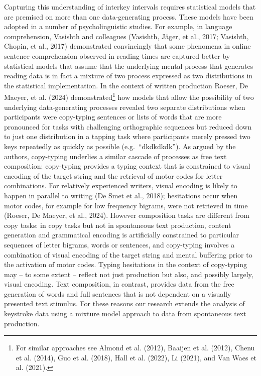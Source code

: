 \documentclass[
  man,floatsintext]{apa7}
\begin{document}
Capturing this understanding of interkey intervals requires statistical models that are premised on more than one data-generating process. These models have been adopted in a number of psycholinguistic studies. For example, in language comprehension, Vasishth and colleagues (Vasishth, Jäger, et al., 2017; Vasishth, Chopin, et al., 2017) demonstrated convincingly that some phenomena in online sentence comprehension observed in reading times are captured better by statistical models that assume that the underlying mental process that generates reading data is in fact a mixture of two process expressed as two distributions in the statistical implementation. In the context of written production Roeser, De Maeyer, et al. (2024) demonstrated\footnote{For similar approaches see Almond et al. (2012), Baaijen et al. (2012), Chenu et al. (2014), Guo et al. (2018), Hall et al. (2022), Li (2021), and Van Waes et al. (2021).} how models that allow the possibility of two underlying data-generating processes revealed two separate distributions when participants were copy-typing sentences or lists of words that are more pronounced for tasks with challenging orthographic sequences but reduced down to just one distribution in a tapping task where participants merely pressed two keys repeatedly as quickly as possible (e.g.~\enquote{dkdkdkdk}). As argued by the authors, copy-typing underlies a similar cascade of processes as free text composition: copy-typing provides a typing context that is constrained to visual encoding of the target string and the retrieval of motor codes for letter combinations. For relatively experienced writers, visual encoding is likely to happen in parallel to writing (De Smet et al., 2018); hesitations occur when motor codes, for example for low frequency bigrams, were not retrieved in time (Roeser, De Maeyer, et al., 2024). However composition tasks are different from copy tasks: in copy tasks but not in spontaneous text production, content generation and grammatical encoding is artificially constrained to particular sequences of letter bigrams, words or sentences, and copy-typing involves a combination of visual encoding of the target string and mental buffering prior to the activation of motor codes. Typing hesitations in the context of copy-typing may -- to some extent -- reflect not just production but also, and possibly largely, visual encoding. Text composition, in contrast, provides data from the free generation of words and full sentences that is not dependent on a visually presented text stimulus. For these reasons our research extends the analysis of keystroke data using a mixture model approach to data from spontaneous text production.
\end{document}
